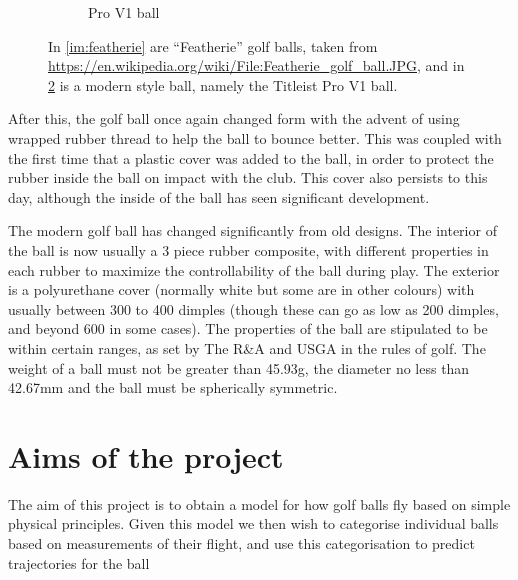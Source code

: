 \begin{figure}[h]
\begin{subfigure}[b]{0.4\textwidth}
\caption{Pro V1 ball}
\label{im:pv1}
\end{subfigure}
\caption[Images of golf balls]{In \ref{im:featherie} are ``Featherie'' golf balls, taken from 
\url{https://en.wikipedia.org/wiki/File:Featherie_golf_ball.JPG}, 
and in \ref{im:pv1} is a modern style ball, namely the Titleist Pro V1 ball.}
\end{figure}

After this, the golf ball once again changed form with the advent of using wrapped rubber
thread to help the ball to bounce better. This was coupled with the first time that a plastic
cover was added to the ball, in order to protect the rubber inside the ball on impact with the
club. This cover also persists to this day, although the inside of the ball has seen significant
development.

The modern golf ball has changed significantly from old designs. The interior of the ball is
now usually a 3 piece rubber composite, with different properties in each rubber to maximize
the controllability of the ball during play. The exterior is a polyurethane cover (normally white
but some are in other colours) with usually between 300 to 400 dimples (though these can go as 
low as 200 dimples, and beyond 600 in some cases). The properties of the ball are stipulated to be
within certain ranges, as set by The R\&A and USGA in the rules of golf. The weight of a ball must
not be greater than 45.93g, the diameter no less than 42.67mm and the ball must be spherically symmetric.

\section{Aims of the project}

The aim of this project is to obtain a model for how golf balls fly based on simple physical principles.
Given this model we then wish to categorise individual balls based on measurements of their flight, and
use this categorisation to predict trajectories for the ball 